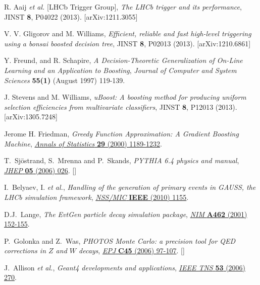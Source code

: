 \documentclass{JINST}
\theoremstyle{definition}
\theoremstyle{remark}
\begin{document}
\begin{thebibliography}{9}

R. Aaij {\em et al.} [LHCb Trigger Group], 
{\em The LHCb trigger and its performance}, 
JINST {\bf 8}, P04022 (2013). 
[arXiv:1211.3055]

V. V. Gligorov and M. Williams, 
{\em Efficient, reliable and fast high-level triggering using a bonsai boosted decision tree}, 
JINST {\bf 8}, P02013 (2013). 
[arXiv:1210.6861]

{Y. Freund, and R. Schapire},
\emph{A Decision-Theoretic Generalization of On-Line Learning and an Application to Boosting}, 
{\emph{Journal of Computer and System Sciences} {\bf 55(1)} (August 1997) 119-139}.

J. Stevens and M. Williams,
{\em uBoost: A boosting method for producing uniform selection efficiencies from multivariate classifiers}, 
JINST {\bf 8}, P12013 (2013). 
[arXiv:1305.7248]

{Jerome H. Friedman},
\emph{Greedy Function Approximation: A Gradient Boosting Machine},
\href{http://statweb.stanford.edu/~jhf/ftp/trebst.pdf}
{\emph{Annals of Statistics} {\bf 29} (2000) 1189-1232}.



T.~Sj\"{o}strand, S.~Mrenna and P.~Skands,
\emph{PYTHIA 6.4 physics and manual},
\href{http://dx.doi.org/10.1088/1126-6708/2006/05/026}
{\emph{JHEP} {\bf 05} (2006) 026}.
[]

I.~Belyaev, I. {\em et al.},
\emph{Handling of the generation of primary events in GAUSS, the LHCb simulation framework},
\href{http://dx.doi.org/10.1109/NSSMIC.2010.5873949}
{\emph{NSS/MIC} {\bf IEEE} (2010) 1155}.

D.J.~Lange,
\emph{The EvtGen particle decay simulation package},
\href{http://dx.doi.org/10.1016/S0168-9002(01)00089-4}
{\emph{NIM} {\bf A462} (2001) 152-155}.

P.~Golonka and Z.~Was,
\emph{PHOTOS Monte Carlo: a precision tool for QED corrections in $Z$ and $W$ decays},
\href{http://dx.doi.org/10.1140/epjc/s2005-02396-4}
{\emph{EPJ} {\bf C45} (2006) 97-107}.
[]

J.~Allison {\em et al.},
\emph{Geant4 developments and applications},
\href{http://dx.doi.org/10.1109/TNS.2006.869826}
{\emph{IEEE TNS} {\bf 53} (2006) 270}.


\end{thebibliography}
\end{document}

